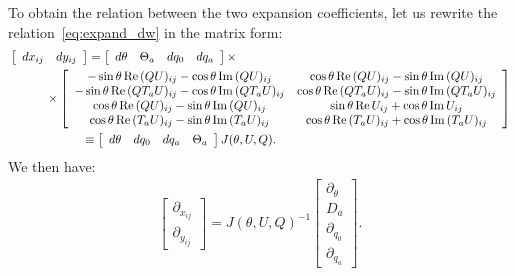 \documentclass[12pt]{article}
\begin{document}
To obtain the relation between the two expansion coefficients,
let us rewrite the relation~\eqref{eq:expand_dw}
in the matrix form:
\begin{align}
  &\left[
    \begin{array}{c c}
      dx_{ij}
      &
        dy_{ij}
    \end{array}
    \right]
    =
    \left[
    \begin{array}{c c c c}
      d\theta & \Theta_a & dq_0 & dq_a
    \end{array}
    \right]
    \times
    \nonumber\\
  &~~~~~~~~~
    \times
    \left[
    \begin{array}{c c}
      -\sin\theta\, {\rm Re}\,(QU)_{ij}-\cos\theta\,{\rm Im}\,(QU)_{ij}
      &
        \cos\theta\, {\rm Re}\,(QU)_{ij}-\sin\theta\,{\rm Im}\,(QU)_{ij}
      \\
      -\sin\theta\, {\rm Re}\,(QT_aU)_{ij}-\cos\theta\,{\rm Im}\,(QT_aU)_{ij}
      &
        \cos\theta\, {\rm Re}\,(QT_aU)_{ij}-\sin\theta\,{\rm Im}\,(QT_aU)_{ij}
      \\
      \cos\theta\, {\rm Re}\,(QU)_{ij}-\sin\theta\,{\rm Im}\,(QU)_{ij}
      &
        \sin\theta\, {\rm Re}\,U_{ij}+\cos\theta\,{\rm Im}\,U_{ij}
      \\
      \cos\theta\, {\rm Re}\,(T_aU)_{ij}-\sin\theta\,{\rm Im}\,(T_aU)_{ij}
      &
        \cos\theta\, {\rm Re}\,(T_aU)_{ij}+\cos\theta\,{\rm Im}\,(T_aU)_{ij}
    \end{array}
    \right]
    \nonumber\\
  &
    ~~~~~~~~~~~~~~~~~~
    \equiv
    \left[
    \begin{array}{c c c c}
      d\theta & dq_0 & dq_a & \Theta_a
    \end{array}
    \right]
    J(\theta, U, Q).
    \label{eq:transf}
\end{align}
We then have:
\begin{align}
  \left[
  \begin{array}{c}
    \partial_{x_{ij}}
    \\
    \partial_{y_{ij}}
  \end{array}
  \right]
  =
  J(\theta, U, Q)^{-1}
  \left[
  \begin{array}{c}
    \partial_\theta
    \\
    D_a
    \\
    \partial_{q_0}
    \\
    \partial_{q_a}
  \end{array}
  \right].
\end{align}
\end{document}
